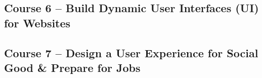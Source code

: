 \documentclass[a4paper,12pt]{report}
\begin{document}
\pagebreak
\subsection[Build Dynamic User Interfaces (UI) for Websites]{Course 6 -- Build Dynamic User Interfaces (UI) for Websites}


\pagebreak
\subsection[Design a User Experience for Social Good \& Prepare for Jobs]{Course 7 -- Design a User Experience for Social Good \& Prepare for Jobs}


% 
% 
\end{document}
